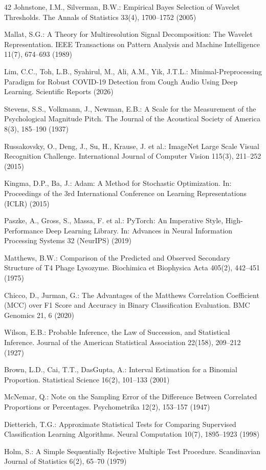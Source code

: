 \begin{thebibliography}{42}
Johnstone, I.M., Silverman, B.W.: Empirical Bayes Selection of Wavelet Thresholds. The Annals of Statistics 33(4), 1700–1752 (2005)

Mallat, S.G.: A Theory for Multiresolution Signal Decomposition: The Wavelet Representation. IEEE Transactions on Pattern Analysis and Machine Intelligence 11(7), 674–693 (1989)

Lim, C.C., Toh, L.B., Syahirul, M., Ali, A.M., Yik, J.T.L.: Minimal-Preprocessing Paradigm for Robust COVID-19 Detection from Cough Audio Using Deep Learning. Scientific Reports (2026)

Stevens, S.S., Volkmann, J., Newman, E.B.: A Scale for the Measurement of the Psychological Magnitude Pitch. The Journal of the Acoustical Society of America 8(3), 185–190 (1937)

Russakovsky, O., Deng, J., Su, H., Krause, J. et al.: ImageNet Large Scale Visual Recognition Challenge. International Journal of Computer Vision 115(3), 211–252 (2015)

Kingma, D.P., Ba, J.: Adam: A Method for Stochastic Optimization. In: Proceedings of the 3rd International Conference on Learning Representations (ICLR) (2015)

Paszke, A., Gross, S., Massa, F. et al.: PyTorch: An Imperative Style, High-Performance Deep Learning Library. In: Advances in Neural Information Processing Systems 32 (NeurIPS) (2019)

Matthews, B.W.: Comparison of the Predicted and Observed Secondary Structure of T4 Phage Lysozyme. Biochimica et Biophysica Acta 405(2), 442–451 (1975)

Chicco, D., Jurman, G.: The Advantages of the Matthews Correlation Coefficient (MCC) over F1 Score and Accuracy in Binary Classification Evaluation. BMC Genomics 21, 6 (2020)

Wilson, E.B.: Probable Inference, the Law of Succession, and Statistical Inference. Journal of the American Statistical Association 22(158), 209–212 (1927)

Brown, L.D., Cai, T.T., DasGupta, A.: Interval Estimation for a Binomial Proportion. Statistical Science 16(2), 101–133 (2001)

McNemar, Q.: Note on the Sampling Error of the Difference Between Correlated Proportions or Percentages. Psychometrika 12(2), 153–157 (1947)

Dietterich, T.G.: Approximate Statistical Tests for Comparing Supervised Classification Learning Algorithms. Neural Computation 10(7), 1895–1923 (1998)

Holm, S.: A Simple Sequentially Rejective Multiple Test Procedure. Scandinavian Journal of Statistics 6(2), 65–70 (1979)

\end{thebibliography}
